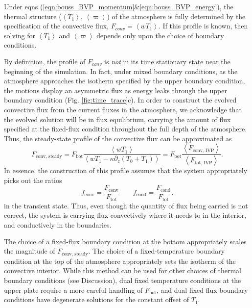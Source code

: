 \documentclass[aps, pre, onecolumn, nofootinbib, notitlepage, groupedaddress, amsfonts, amssymb, amsmath, longbibliography]{revtex4-1}
\newcommand{\angles}[1]{\ensuremath{\left\langle #1 \right\rangle}}
\begin{document}
Under eqns (\ref{eqn:bouss_BVP_momentum}\&\ref{eqn:bouss_BVP_energy}), 
the thermal structure ($\angles{T_1}$, $\angles{\varpi}$) of the atmosphere is fully determined by the specification
of the convective flux, $F_{conv} = \angles{w T_1}$.  If this profile is known, then 
solving for $\angles{T_1}$ and
$\angles{\varpi}$ depends only upon the choice of boundary conditions.

By definition, the profile of $F_{conv}$ is \emph{not} in its time stationary state near the
beginning of the simulation.  In fact, under mixed boundary conditions, as the atmosphere approaches the
isotherm specified by the upper boundary condition, the motions display an asymmetric flux as energy
leaks through the upper boundary condition (Fig. \ref{fig:time_trace}c).  
In order to construct the evolved convective flux from the current fluxes in the atmosphere,
we acknowledge that the evolved solution will be in flux equilibrium, 
carrying the amount of flux specified at the fixed-flux condition throughout the full depth of the atmosphere.  
Thus, the steady-state profile of the convective flux can be approximated as
\begin{equation}
F_{\text{conv, steady}} = F_{\text{bot}}\frac{\angles{wT_1}}{\angles{wT_1 - \kappa \partial_z (T_0 + T_1)}}
= F_{\text{bot}}\frac{\angles{F_{\text{conv, IVP}}}}{\angles{F_{\text{tot, IVP}}}}.
\label{eqn:bouss_BVP_fconv}
\end{equation}
In essence, the construction of this profile assumes that the system appropriately picks out the ratios
\begin{equation}
f_{\text{conv}} = \frac{F_{\text{conv}}}{F_{\text{tot}}}\qquad
f_{\text{cond}} = \frac{F_{\text{cond}}}{F_{\text{tot}}}.
\end{equation}
in the transient state.  Thus, even though the quantity of flux being carried is not correct, the
system is carrying flux convectively where it needs to in the interior, and conductively in the boundaries.

The choice of a fixed-flux boundary condition at the bottom appropriately scales the magnitude of
$F_{\text{conv, steady}}$.  The choice of a fixed-temperature boundary condition at the top of the
atmosphere appropriately sets the isotherm of the convective interior.  While this method can be used
for other choices of thermal boundary conditions (see Discussion), dual fixed temperature conditions
at the upper plate require a more careful handling of $F_{\text{bot}}$, and dual fixed flux boundary
conditions have degenerate solutions for the constant offset of $T_1$.
\end{document}
